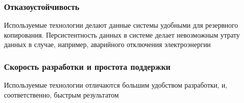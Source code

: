 \documentclass{beamer}
\begin{document}
\begin{frame}
\frametitle{Отказоустойчивость}
	Используемые технологии делают данные системы удобными для резервного
	копирования. Персистентность данных в системе делает невозможным утрату данных в
	случае, например, аварийного отключения электроэнергии
\end{frame}

\begin{frame}
\frametitle{Скорость разработки и простота поддержки}
	Используемые технологии отличаются большим удобством разработки, и,
	соответственно, быстрым результатом
\end{frame}
\end{document}
